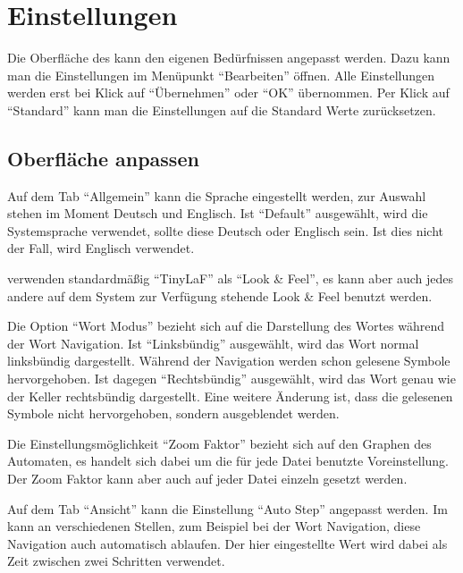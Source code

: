 

\chapter{Einstellungen}\label{Preferences}

Die Oberfläche des \gtitools kann den eigenen Bedürfnissen angepasst werden.
Dazu kann man die Einstellungen im Menüpunkt "`Bearbeiten"' öffnen. Alle
Einstellungen werden erst bei Klick auf "`Übernehmen"' oder "`OK"' übernommen.
Per Klick auf "`Standard"' kann man die Einstellungen auf die Standard Werte
zurücksetzen.


\section{Oberfläche anpassen}

Auf dem Tab "`Allgemein"' kann die Sprache eingestellt werden, zur Auswahl
stehen im Moment Deutsch und Englisch. Ist "`Default"' ausgewählt, wird
die Systemsprache verwendet, sollte diese Deutsch oder Englisch sein. Ist dies
nicht der Fall, wird Englisch verwendet.\vspace{10pt}

\gtitool verwenden standardmäßig "`TinyLaF"' als "`Look \& Feel"', es kann aber
auch jedes andere auf dem System zur Verfügung stehende Look \& Feel benutzt
werden.\vspace{10pt}

Die Option "`Wort Modus"' bezieht sich auf die Darstellung des Wortes während
der Wort Navigation. Ist "`Linksbündig"' ausgewählt, wird das Wort normal
linksbündig dargestellt. Während der Navigation werden schon gelesene Symbole
hervorgehoben. Ist dagegen "`Rechtsbündig"' ausgewählt, wird das Wort genau wie
der Keller rechtsbündig dargestellt. Eine weitere Änderung ist, dass die
gelesenen Symbole nicht hervorgehoben, sondern ausgeblendet werden.\vspace{10pt}

Die Ein\-stell\-ungs\-möglich\-keit "`Zoom Faktor"' bezieht sich auf den Graphen 
des Automaten, es handelt sich dabei um die für jede Datei benutzte
Voreinstellung. Der Zoom Faktor kann aber auch auf jeder Datei einzeln gesetzt
werden.\vspace{10pt}

Auf dem Tab "`Ansicht"' kann die Einstellung "`Auto Step"' angepasst werden. Im
\gtitool kann an verschiedenen Stellen, zum Beispiel bei der Wort Navigation, diese
Navigation auch automatisch ablaufen. Der hier eingestellte Wert wird dabei
als Zeit zwischen zwei Schritten verwendet.\vspace{10pt}


